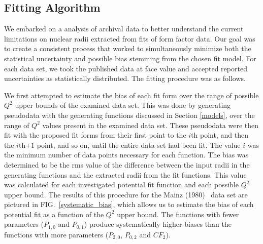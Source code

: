 \documentclass[aps,prd,twocolumn,groupedaddress,10pt]{revtex4-1}
\begin{document}
\subsection{Fitting Algorithm}
We embarked on a analysis of archival data to better understand the current limitations on nuclear radii extracted from fits of form factor data. Our goal was to create a consistent process that worked to simultaneously minimize both the statistical uncertainty and possible bias stemming from the chosen fit model. For each data set, we took the published data at face value and accepted reported uncertainties as statistically distributed. The fitting procedure was as follows.

We first attempted to estimate the bias of each fit form over the range of possible $Q^2$ upper bounds of the examined data set. This was done by generating pseudodata with the generating functions discussed in Section \ref{models}, over the range of $Q^2$ values present in the examined data set. These pseudodata were then fit with the proposed fit forms from their first point to the $i$th point, and then the $i$th$+1$ point, and so on, until the entire data set had been fit. The value $i$ was the minimum number of data points necessary for each function. The bias was determined to be the rms value of the difference between the input radii in the generating functions and the extracted radii from the fit functions. This value was calculated for each investigated potential fit function and each possible $Q^2$ upper bound. The results of this procedure for the Mainz (1980)~\cite{Mainz1980} data set are pictured in FIG.~\ref{systematic_bias}, which allows us to estimate the bias of each potential fit as a function of the $Q^2$ upper bound. The functions with fewer parameters ($P_{1,0}$ and $P_{0,1}$) produce systematically higher biases than the functions with more parameters ($P_{2,0}$, $P_{0,2}$ and ${CF}_2$).
\end{document}
